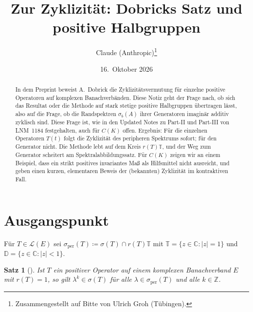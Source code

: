 \documentclass[11pt,a4paper]{article}
\title{Zur Zyklizität: Dobricks Satz und positive Halbgruppen}
\author{Claude (Anthropic)\thanks{Zusammengestellt auf Bitte von Ulrich Groh (Tübingen).}}
\date{16.~Oktober 2026}
\newtheorem{satz}{Satz}
\theoremstyle{remark}
\theoremstyle{definition}
\newcommand{\C}{\mathbb{C}}
\newcommand{\Z}{\mathbb{Z}}
\newcommand{\T}{\mathbb{T}}
\newcommand{\D}{\mathbb{D}}
\newcommand{\sperb}{\sigma_{\mathrm{per}}}
\begin{document}
\maketitle

\begin{abstract}
In dem Preprint \cite{dobrick} beweist A.~Dobrick die Zyklizitätsvermutung für einzelne positive Operatoren auf komplexen Banachverbänden.
Diese Notiz geht der Frage nach, ob sich das Resultat oder die Methode auf stark stetige positive Halbgruppen übertragen lässt, also auf die Frage, ob die Randspektren $\sigma_b(A)$ ihrer Generatoren imaginär additiv zyklisch sind.
Diese Frage ist, wie in den Updated Notes zu Part-II und Part-III von LNM~1184 \cite{ln} festgehalten, auch für $C(K)$ offen.
Ergebnis: Für die einzelnen Operatoren $T(t)$ folgt die Zyklizität des peripheren Spektrums sofort; für den Generator nicht.
Die Methode lebt auf dem Kreis $r(T)\T$, und der Weg zum Generator scheitert am Spektralabbildungssatz.
Für $C(K)$ zeigen wir an einem Beispiel, dass ein strikt positives invariantes Maß als Hilfsmittel nicht ausreicht, und geben einen kurzen, elementaren Beweis der (bekannten) Zyklizität im kontraktiven Fall.
\end{abstract}

\section{Ausgangspunkt}

Für $T \in \mathcal{L}(E)$ sei $\sperb(T) \coloneqq \sigma(T) \cap r(T)\T$ mit $\T = \{z \in \C \colon |z| = 1\}$ und $\D = \{z \in \C \colon |z| < 1\}$.

\begin{satz}[{\cite[Theorem~1.2]{dobrick}}]\label{satz:dobrick}
Ist $T$ ein positiver Operator auf einem komplexen Banachverband $E$ mit $r(T) = 1$, so gilt $\lambda^k \in \sigma(T)$ für alle $\lambda \in \sperb(T)$ und alle $k \in \Z$.
\end{satz}
\end{document}
